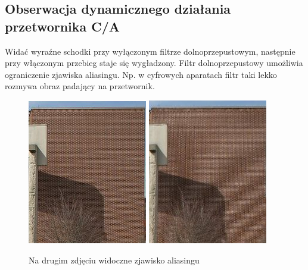 \documentclass{article}
\begin{document}
\subsection{Obserwacja dynamicznego działania przetwornika C/A}
\label{subsec:dynamiczne_C/A}
Widać wyraźne schodki przy wyłączonym filtrze dolnoprzepustowym, następnie przy włączonym przebieg staje się
wygładzony. Filtr dolnoprzepustowy umożliwia ograniczenie zjawiska aliasingu. Np. w cyfrowych aparatach filtr taki lekko rozmywa obraz padający na przetwornik.

\begin{figure}[h!]
	\centering
	\includegraphics[scale=0.65]{img1}
	\includegraphics[scale=0.65]{img2}
	\caption{Na drugim zdjęciu widoczne zjawisko aliasingu}
\end{figure}
\end{document}
